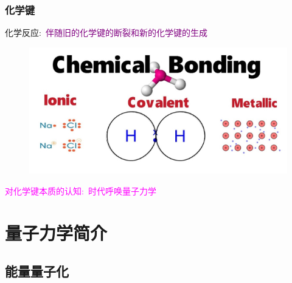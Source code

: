 \frame
{
	\frametitle{化学键}
化学反应:~\textcolor{purple}{伴随旧的化学键的断裂和新的化学键的生成}
\begin{figure}[h!]
\centering
\includegraphics[height=0.50\textwidth,width=1.0\textwidth,viewport=0 0 580 280,clip]{Figures/Chemical_Bonding.jpg}
\label{Chemical_Bond-2}
\end{figure}
{\centering\textcolor{magenta}{对化学键本质的认知:~时代呼唤量子力学}}
}

\section{量子力学简介}
\subsection{能量量子化}

